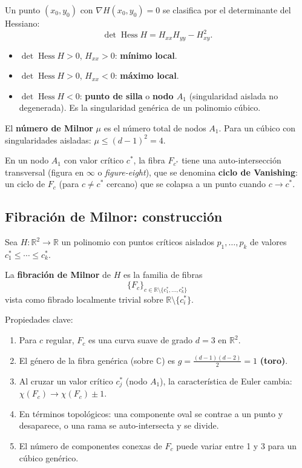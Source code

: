 \documentclass[11pt,a4paper]{article}
\DeclareMathOperator{\Hess}{Hess}
\newcommand{\R}{\mathbb{R}}
\newcommand{\C}{\mathbb{C}}
\begin{document}
\begin{tcolorbox}[defbox,title={Clasificación de puntos críticos}]
Un punto $(x_0,y_0)$ con $\nabla H(x_0,y_0)=0$ se clasifica por el determinante
del Hessiano:
\[
  \det\Hess H = H_{xx}H_{yy} - H_{xy}^2.
\]
\begin{itemize}[noitemsep]
  \item $\det\Hess H > 0$, $H_{xx}>0$: \textbf{mínimo local}.
  \item $\det\Hess H > 0$, $H_{xx}<0$: \textbf{máximo local}.
  \item $\det\Hess H < 0$: \textbf{punto de silla} o \textbf{nodo $A_1$}
        (singularidad aislada no degenerada). Es la singularidad genérica de un polinomio cúbico.
\end{itemize}
El \textbf{número de Milnor} $\mu$ es el número total de nodos $A_1$.
Para un cúbico con singularidades aisladas: $\mu \leq (d-1)^2 = 4$.
\end{tcolorbox}

En un nodo $A_1$ con valor crítico $c^*$, la fibra $F_{c^*}$ tiene una
auto-intersección transversal (figura en $\infty$ o \textit{figure-eight}),
que se denomina \textbf{ciclo de Van\-ishing}: un ciclo de $F_c$ (para
$c\neq c^*$ cercano) que se colapsa a un punto cuando $c\to c^*$.

\subsection{Fibración de Milnor: construcción}

\begin{tcolorbox}[theorembox,
  title={Fibración de Milnor para polinomios reales en $\R^2$}]
Sea $H:\R^2\to\R$ un polinomio con puntos críticos aislados
$p_1,\ldots,p_k$ de valores $c^*_1\leq\cdots\leq c^*_k$.

La \textbf{fibración de Milnor} de $H$ es la familia de fibras
\[
  \{F_c\}_{c\in\R\setminus\{c^*_1,\ldots,c^*_k\}}
\]
vista como fibrado localmente trivial sobre $\R\setminus\{c^*_i\}$.

Propiedades clave:
\begin{enumerate}[noitemsep]
  \item Para $c$ regular, $F_c$ es una curva suave de grado $d=3$ en $\R^2$.
  \item El género de la fibra genérica (sobre $\C$) es
        $g = \tfrac{(d-1)(d-2)}{2} = 1$ \textbf{(toro)}.
  \item Al cruzar un valor crítico $c^*_j$ (nodo $A_1$), la característica
        de Euler cambia: $\chi(F_c) \to \chi(F_c) \pm 1$.
  \item En términos topológicos: una componente oval se contrae a un punto
        y desaparece, o una rama se auto-intersecta y se divide.
  \item El número de componentes conexas de $F_c$ puede variar entre 1 y 3
        para un cúbico genérico.
\end{enumerate}
\end{tcolorbox}
\end{document}
